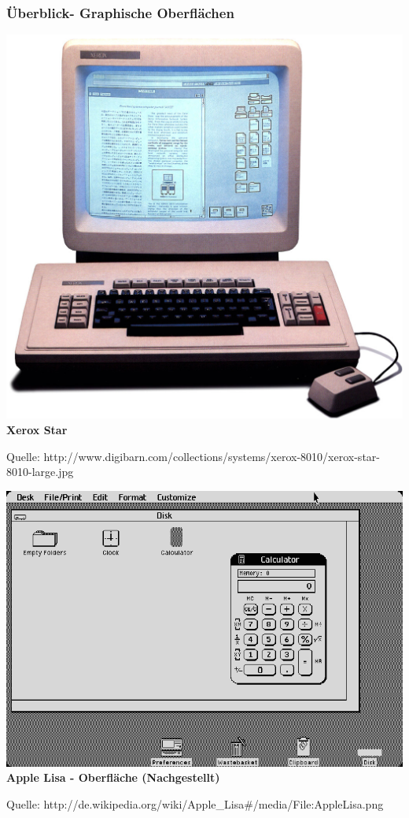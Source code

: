 \documentclass[12pt,a4paper]{report}
\begin{document}
\begin{onehalfspace}
\subsubsection{Überblick- Graphische Oberflächen}
\begin{center}
\includegraphics[scale=1]{../docs/lyaton/graphics/Xerox-Star.jpg}\\
\textbf{Xerox Star}\\
\begin{scriptsize}
Quelle: http://www.digibarn.com/collections/systems/xerox-8010/xerox-star-8010-large.jpg
\end{scriptsize}
\end{center}

\begin{center}
\includegraphics[scale=0.6]{../docs/lyaton/graphics/Apple-Lisa.png}\\
\textbf{Apple Lisa - Oberfläche (Nachgestellt)}\\
\begin{scriptsize}
Quelle: http://de.wikipedia.org/wiki/Apple\_Lisa\#/media/File:AppleLisa.png
\end{scriptsize}
\end{center}


\end{onehalfspace}
\end{document}
